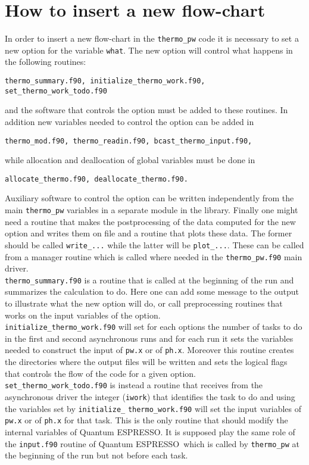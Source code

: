 \documentclass[12pt,a4paper]{article}
\def\qe{{\sc Quantum ESPRESSO}}
\begin{document}
\section{\color{coral}How to insert a new flow-chart}
In order to insert a new flow-chart in the \texttt{thermo\_pw} code it
is necessary to set a new option for the variable \texttt{what}. The
new option will control what happens in the following routines:
\begin{verbatim}
thermo_summary.f90, initialize_thermo_work.f90, set_thermo_work_todo.f90
\end{verbatim}
and the software that controls the option must be added to these routines.
In addition new variables needed to control the option can be added
in 
\begin{verbatim}
thermo_mod.f90, thermo_readin.f90, bcast_thermo_input.f90,
\end{verbatim}
while allocation and deallocation of global variables must be done
in 
\begin{verbatim}
allocate_thermo.f90, deallocate_thermo.f90.
\end{verbatim}
Auxiliary software to control the option can be written independently
from the main \texttt{thermo\_pw} variables in a separate
module in the library. Finally one might need a routine that makes the
postprocessing of the data computed for the new option and writes them on
file and a routine that plots these data. The former should be called 
\texttt{write\_...} while the latter will be \texttt{plot\_...}.
These can be called from a manager routine which is called where needed
in the \texttt{thermo\_pw.f90} main driver. \\
\texttt{thermo\_summary.f90} is a routine that is called at the beginning of the
run and summarizes the calculation to do. Here one can add some message
to the output to illustrate what the new option will do, or call 
preprocessing routines that works on the input variables of the option. \\
\texttt{initialize\_thermo\_work.f90} will set for each options the
number of tasks to do in the first and second asynchronous runs and
for each run it sets the variables needed to construct the
input of \texttt{pw.x} or of \texttt{ph.x}. Moreover this routine creates
the directories where the output files will be written and sets the
logical flags that controls the flow of the code for a given option. \\
\texttt{set\_thermo\_work\_todo.f90} is instead a routine that receives
from the asynchronous driver the integer (\texttt{iwork}) that identifies
the task to do and using the variables set by
\texttt{initialize\_} \texttt{thermo\_work.f90} will set the input variables
of \texttt{pw.x} or of \texttt{ph.x} for that task. This is the only 
routine that should modify the internal variables of \qe. It is supposed
play the same role of the \texttt{input.f90} routine of \qe\  
which is called by \texttt{thermo\_pw} at the beginning of the run
but not before each task.
\end{document}
